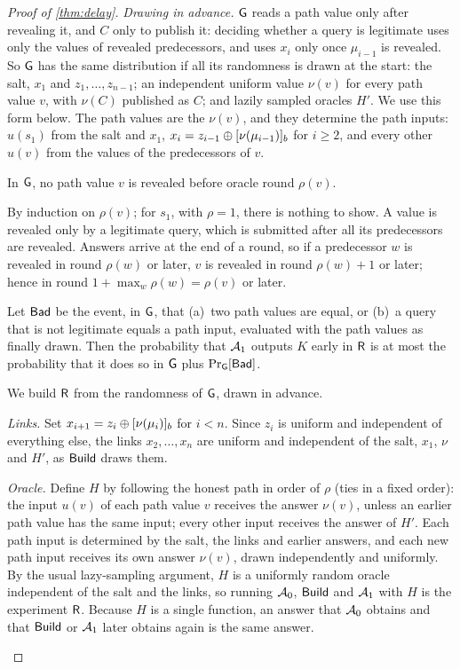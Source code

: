 \begin{proof}[Proof of \cref{thm:delay}]
\emph{Drawing in advance.}
$\mathsf{G}$ reads a path value only after revealing it, and $C$ only to publish it: deciding whether a query is legitimate uses only the values of revealed predecessors, and uses $x_i$ only once $\mu_{i-1}$ is revealed. So $\mathsf{G}$ has the same distribution if all its randomness is drawn at the start: the salt, $x_1$ and $z_1, \dots, z_{n-1}$; an independent uniform value $\nu(v)$ for every path value $v$, with $\nu(C)$ published as $C$; and lazily sampled oracles $H'$. We use this form below. The path values are the $\nu(v)$, and they determine the path inputs: $u(s_1)$ from the salt and $x_1$, $x_i = z_{i-1} \oplus [\nu(\mu_{i-1})]_{b}$ for $i \ge 2$, and every other $u(v)$ from the values of the predecessors of $v$.

\begin{claim}\label{claim:sequential}
In $\mathsf{G}$, no path value $v$ is revealed before oracle round $\rho(v)$.
\end{claim}
\begin{claimproof}
By induction on $\rho(v)$; for $s_1$, with $\rho = 1$, there is nothing to show. A value is revealed only by a legitimate query, which is submitted after all its predecessors are revealed. Answers arrive at the end of a round, so if a predecessor $w$ is revealed in round $\rho(w)$ or later, $v$ is revealed in round $\rho(w) + 1$ or later; hence in round $1 + \max_w \rho(w) = \rho(v)$ or later.
\end{claimproof}

\begin{claim}\label{claim:hybrid}
Let $\mathsf{Bad}$ be the event, in $\mathsf{G}$, that (a)~two path values are equal, or (b)~a query that is not legitimate equals a path input, evaluated with the path values as finally drawn. Then the probability that $\mathcal{A}_1$ outputs $K$ early in $\mathsf{R}$ is at most the probability that it does so in $\mathsf{G}$ plus $\Pr_{\mathsf{G}}[\mathsf{Bad}]$.
\end{claim}
\begin{claimproof}
We build $\mathsf{R}$ from the randomness of $\mathsf{G}$, drawn in advance.

\emph{Links.} Set $x_{i+1} = z_i \oplus [\nu(\mu_i)]_{b}$ for $i < n$. Since $z_i$ is uniform and independent of everything else, the links $x_2, \dots, x_n$ are uniform and independent of the salt, $x_1$, $\nu$ and $H'$, as $\mathsf{Build}$ draws them.

\emph{Oracle.} Define $H$ by following the honest path in order of $\rho$ (ties in a fixed order): the input $u(v)$ of each path value $v$ receives the answer $\nu(v)$, unless an earlier path value has the same input; every other input receives the answer of $H'$. Each path input is determined by the salt, the links and earlier answers, and each new path input receives its own answer $\nu(v)$, drawn independently and uniformly. By the usual lazy-sampling argument, $H$ is a uniformly random oracle independent of the salt and the links, so running $\mathcal{A}_0$, $\mathsf{Build}$ and $\mathcal{A}_1$ with $H$ is the experiment $\mathsf{R}$. Because $H$ is a single function, an answer that $\mathcal{A}_0$ obtains and that $\mathsf{Build}$ or $\mathcal{A}_1$ later obtains again is the same answer.


\end{claimproof}
\end{proof}
